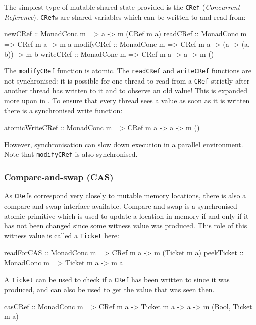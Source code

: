 The simplest type of mutable shared state provided is the \verb|CRef|
(\emph{Concurrent Reference}). \verb|CRef|s are shared variables which
can be written to and read from:

\begin{haskellcode}
newCRef    :: MonadConc m => a -> m (CRef m a)
readCRef   :: MonadConc m => CRef m a -> m a
modifyCRef :: MonadConc m => CRef m a -> (a -> (a, b)) -> m b
writeCRef  :: MonadConc m => CRef m a -> a -> m ()
\end{haskellcode}

The \verb|modifyCRef| function is atomic. The \verb|readCRef| and
\verb|writeCRef| functions are not synchronised: it is possible for
one thread to read from a \verb|CRef| strictly after another thread
has written to it and to observe an old value!  This is expanded more
upon in . To ensure that every thread sees a
value as soon as it is written there is a synchronised write function:

\begin{haskellcode}
atomicWriteCRef :: MonadConc m => CRef m a -> a -> m ()
\end{haskellcode}

However, synchronisation can slow down execution in a parallel
environment. Note that \verb|modifyCRef| is also synchronised.

\subsubsection{Compare-and-swap (CAS)}
\label{sec:abstraction-typeclass-cas}

As \verb|CRef|s correspond very closely to mutable memory locations,
there is also a compare-and-swap interface available. Compare-and-swap
is a synchronised atomic primitive which is used to update a location
in memory if and only if it has not been changed since some witness
value was produced. This role of this witness value is called a
\verb|Ticket| here:

\begin{haskellcode}
readForCAS :: MonadConc m => CRef m a -> m (Ticket m a)
peekTicket :: MonadConc m => Ticket m a -> m a
\end{haskellcode}

A \verb|Ticket| can be used to check if a \verb|CRef| has been written
to since it was produced, and can also be used to get the value that
was seen then.

\begin{haskellcode}
casCRef :: MonadConc m => CRef m a -> Ticket m a -> a -> m (Bool, Ticket m a)
\end{haskellcode}

